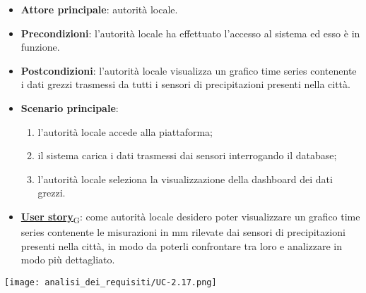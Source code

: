 \begin{itemize}
	\item \textbf{Attore principale}: autorità locale.
	\item \textbf{Precondizioni}: l'autorità locale ha effettuato l'accesso al sistema ed esso è in funzione.
	\item \textbf{Postcondizioni}: l'autorità locale visualizza un grafico time series contenente i dati grezzi trasmessi da tutti i sensori
	      di precipitazioni presenti nella città.
	\item \textbf{Scenario principale}:
	      \begin{enumerate}
		      \item l'autorità locale accede alla piattaforma;
		      \item il sistema carica i dati trasmessi dai sensori interrogando il database;
		      \item l'autorità locale seleziona la visualizzazione della dashboard dei dati grezzi.
	      \end{enumerate}
	\item \href{https://7last.github.io/docs/rtb/documentazione-interna/glossario\#user-story}{\textbf{User story}\textsubscript{G}}:
	      come autorità locale desidero poter visualizzare un grafico time series contenente le misurazioni in mm rilevate dai sensori
	      di precipitazioni presenti nella città, in modo da poterli confrontare tra loro e analizzare in modo più dettagliato.
\end{itemize}
\begin{center}
	\texttt{[image: analisi\_dei\_requisiti/UC-2.17.png]}
\end{center}



